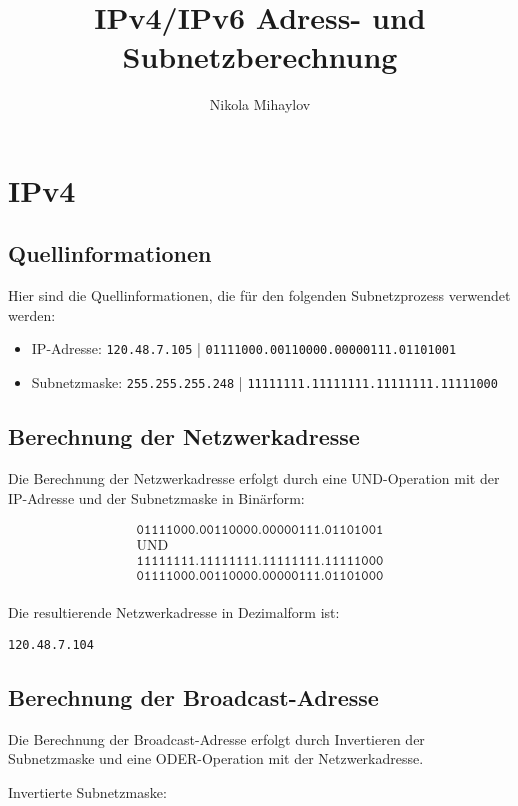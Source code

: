 \documentclass{article}
\title{IPv4/IPv6 Adress- und Subnetzberechnung}
\author{Nikola Mihaylov}
\date{}
\begin{document}
\maketitle

\section*{IPv4}

\subsection*{Quellinformationen}

Hier sind die Quellinformationen, die für den folgenden Subnetzprozess verwendet werden:

\begin{itemize}
    \item IP-Adresse: \texttt{120.48.7.105} | \texttt{01111000.00110000.00000111.01101001}
    \item Subnetzmaske: \texttt{255.255.255.248} | \texttt{11111111.11111111.11111111.11111000}
\end{itemize}

\subsection*{Berechnung der Netzwerkadresse}
Die Berechnung der Netzwerkadresse erfolgt durch eine UND-Operation mit der IP-Adresse und der Subnetzmaske in Binärform:

\[
\begin{array}{c}
\texttt{01111000.00110000.00000111.01101001} \\
\text{UND} \\
\texttt{11111111.11111111.11111111.11111000} \\
\hline
\texttt{01111000.00110000.00000111.01101000} \\
\end{array}
\]

Die resultierende Netzwerkadresse in Dezimalform ist:

\texttt{120.48.7.104}

\subsection*{Berechnung der Broadcast-Adresse}
Die Berechnung der Broadcast-Adresse erfolgt durch Invertieren der Subnetzmaske und eine ODER-Operation mit der Netzwerkadresse.

Invertierte Subnetzmaske:
\end{document}
